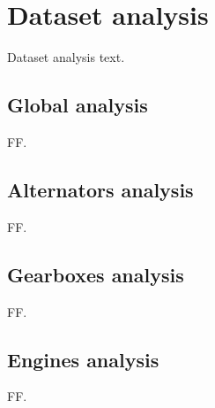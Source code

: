 \section{Dataset analysis}\label{sec:dataset-analysis}

Dataset analysis text.

\subsection{Global analysis}

FF.


\subsection{Alternators analysis}

FF.


\subsection{Gearboxes analysis}

FF.


\subsection{Engines analysis}

FF.
